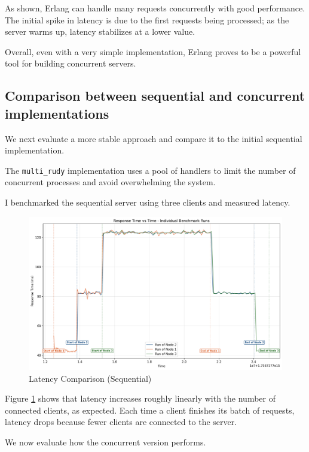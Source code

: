 \documentclass[a4paper, 11pt]{article}
\begin{document}
As shown, Erlang can handle many requests concurrently with good performance. The initial spike in latency is due to the first requests being processed; as the server warms up, latency stabilizes at a lower value.

Overall, even with a very simple implementation, Erlang proves to be a powerful tool for building concurrent servers.

\subsection{Comparison between sequential and concurrent implementations}

We next evaluate a more stable approach and compare it to the initial sequential implementation.

The \texttt{multi\_rudy} implementation uses a pool of handlers to limit the number of concurrent processes and avoid overwhelming the system.

I benchmarked the sequential server using three clients and measured latency.

\begin{figure}[H]
  \centering
  \includegraphics[width=0.9\linewidth]{sequential_benches/latency_plot.png}
  \caption{Latency Comparison (Sequential)}
  \label{fig:latency_comparison_seq}
\end{figure}
\FloatBarrier

Figure \ref{fig:latency_comparison_seq} shows that latency increases roughly linearly with the number of connected clients, as expected. Each time a client finishes its batch of requests, latency drops because fewer clients are connected to the server.

We now evaluate how the concurrent version performs.
\end{document}
